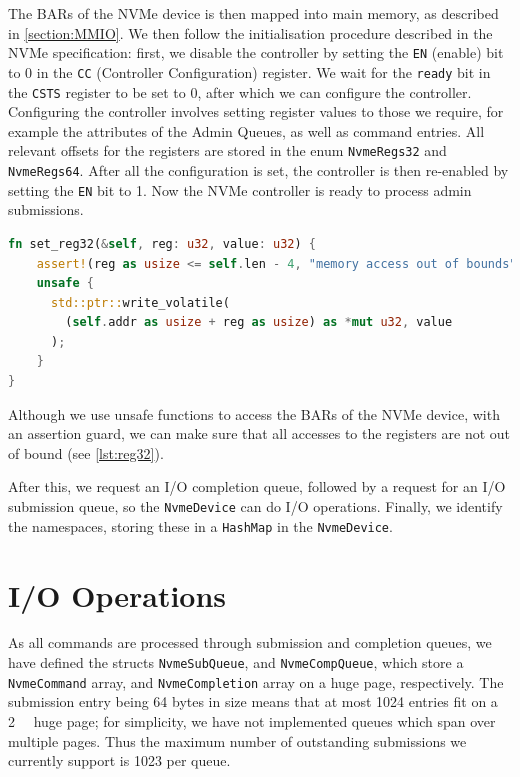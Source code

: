 The BARs of the NVMe device is then mapped into main memory, as described in \autoref{section:MMIO}. We then follow the initialisation procedure described in the NVMe specification: first, we disable the controller by setting the \texttt{EN} (enable) bit to 0 in the \texttt{CC} (Controller Configuration) register. We wait for the \texttt{ready} bit in the \texttt{CSTS} register to be set to 0, after which we can configure the controller. Configuring the controller involves setting register values to those we require, for example the attributes of the Admin Queues, as well as command entries. All relevant offsets for the registers are stored in the enum \texttt{NvmeRegs32} and \texttt{NvmeRegs64}. After all the configuration is set, the controller is then re-enabled by setting the \texttt{EN} bit to 1. Now the NVMe controller is ready to process admin submissions.

\begin{lstlisting}[language=Rust, label=lst:reg32,caption=Writing to a 32 bit register]
fn set_reg32(&self, reg: u32, value: u32) {
    assert!(reg as usize <= self.len - 4, "memory access out of bounds");
    unsafe {
      std::ptr::write_volatile(
        (self.addr as usize + reg as usize) as *mut u32, value
      );
    }
}
\end{lstlisting}

Although we use unsafe functions to access the BARs of the NVMe device, with an assertion guard, we can make sure that all accesses to the registers are not out of bound (see \autoref{lst:reg32}).

After this, we request an I/O completion queue, followed by a request for an I/O submission queue, so the \texttt{NvmeDevice} can do I/O operations. Finally, we identify the namespaces, storing these in a \texttt{HashMap} in the \texttt{NvmeDevice}.

\section{I/O Operations}\label{subsection:io}
As all commands are processed through submission and completion queues, we have defined the structs \texttt{NvmeSubQueue}, and \texttt{NvmeCompQueue}, which store a \texttt{NvmeCommand} array, and \texttt{NvmeCompletion} array on a huge page, respectively. The submission entry being 64 bytes in size means that at most 1024 entries fit on a \qty{2}{\mebi\byte} huge page; for simplicity, we have not implemented queues which span over multiple pages. Thus the maximum number of outstanding submissions we currently support is 1023 per queue.

